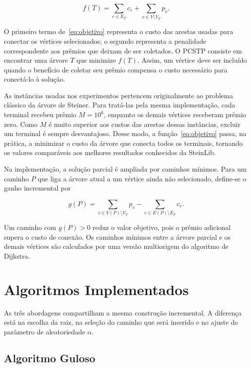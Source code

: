 \documentclass[12pt]{article}
\begin{document}
\begin{equation}
    f(T)=\sum_{e\in E_T}c_e+\sum_{v\in V\setminus V_T}p_v.
    \label{eq:objetivo}
\end{equation}

O primeiro termo de~\eqref{eq:objetivo} representa o custo das arestas usadas para conectar os vértices selecionados; o segundo representa a penalidade correspondente aos prêmios que deixam de ser coletados. O PCSTP consiste em encontrar uma árvore $T$ que minimize $f(T)$. Assim, um vértice deve ser incluído quando o benefício de coletar seu prêmio compensa o custo necessário para conectá-lo à solução.

As instâncias usadas nos experimentos pertencem originalmente ao problema clássico da árvore de Steiner. Para tratá-las pela mesma implementação, cada terminal recebeu prêmio $M=10^6$, enquanto os demais vértices receberam prêmio zero. Como $M$ é muito superior aos custos das arestas dessas instâncias, excluir um terminal é sempre desvantajoso. Desse modo, a função~\eqref{eq:objetivo} passa, na prática, a minimizar o custo da árvore que conecta todos os terminais, tornando os valores comparáveis aos melhores resultados conhecidos da SteinLib.

Na implementação, a solução parcial é ampliada por caminhos mínimos. Para um caminho $P$ que liga a árvore atual a um vértice ainda não selecionado, define-se o ganho incremental por

\begin{equation}
    g(P)=\sum_{v\in V(P)\setminus V_T}p_v-\sum_{e\in E(P)\setminus E_T}c_e.
    \label{eq:ganho}
\end{equation}

Um caminho com $g(P)>0$ reduz o valor objetivo, pois o prêmio adicional supera o custo de conexão. Os caminhos mínimos entre a árvore parcial e os demais vértices são calculados por uma versão multiorigem do algoritmo de Dijkstra.

\section{Algoritmos Implementados}
\label{sec:algoritmos}

As três abordagens compartilham a mesma construção incremental. A diferença está na escolha da raiz, na seleção do caminho que será inserido e no ajuste do parâmetro de aleatoriedade $\alpha$.

\subsection{Algoritmo Guloso}
\end{document}
